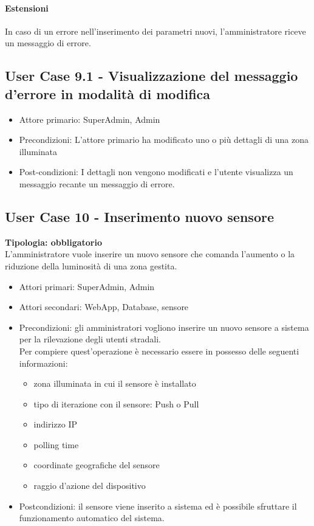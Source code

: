 \documentclass[12pt]{article}
\begin{document}
\paragraph{Estensioni} In caso di un errore nell'inserimento dei parametri nuovi, l'amministratore riceve un messaggio di errore.

\subsection{User Case 9.1 - Visualizzazione del messaggio d'errore in modalità di modifica}
\begin{itemize}
	\item Attore primario: SuperAdmin, Admin
	\item Precondizioni: L'attore primario ha modificato uno o più dettagli di una zona illuminata
	\item Post-condizioni: I dettagli non vengono modificati e l'utente visualizza un messaggio recante un messaggio di errore.
\end{itemize}

\subsection{User Case 10 - Inserimento nuovo sensore}
\textbf{Tipologia: obbligatorio}\\
L'amministratore vuole inserire un nuovo sensore che comanda l'aumento o la riduzione della luminosità di una zona gestita.
\begin{itemize}
	\item Attori primari: SuperAdmin, Admin
	\item Attori secondari: WebApp, Database, sensore
	\item Precondizioni: gli amministratori vogliono inserire un nuovo sensore a sistema per la rilevazione degli utenti stradali.\\
	 Per compiere quest'operazione è necessario essere in possesso delle seguenti informazioni: 
	\begin{itemize}
		\item zona illuminata in cui il sensore è installato
		\item tipo di iterazione con il sensore: Push o Pull
		\item indirizzo IP
		\item polling time
		\item coordinate geografiche del sensore
		\item raggio d'azione del dispositivo
	\end{itemize}
	\item Postcondizioni: il sensore viene inserito a sistema ed è possibile sfruttare il funzionamento automatico del sistema.
\end{itemize}
\end{document}
